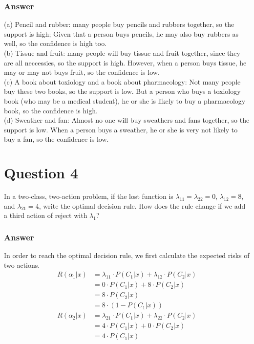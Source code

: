 \documentclass{article}
\begin{document}
\subsubsection*{Answer}
(a) Pencil and rubber: many people buy pencils and rubbers together, so the support is high; Given that a person buys pencils, he may also buy rubbers as well, so the confidence is high too.\\
(b) Tissue and fruit: many people will buy tissue and fruit together, since they are all neccessies, so the support is high. However, when a person buys tissue, he may or may not buys fruit, so the confidence is low.\\
(c) A book about toxiology and a book about pharmacology: Not many people buy these two books, so the support is low. But a person who buys a toxiology book (who may be a medical student), he or she is likely to buy a pharmacology book, so the confidence is high. \\
(d) Sweather and fan: Almost no one will buy sweathers and fans together, so the support is low. When a person buys a sweather, he or she is very not likely to buy a fan, so the confidence is low.


\section*{Question 4}
In a two-class, two-action problem, if the lost function is $\lambda_{11}=\lambda_{22}=0$, $\lambda_{12}=8$, and $\lambda_{21}=4$, write 
the optimal decision rule. How does the rule change if we add a third action of reject with $\lambda_1$?
\subsubsection*{Answer}
In order to reach the optimal decision rule, we first calculate the expected risks of two actions.
\begin{align*}
R(\alpha_1|x) &=\lambda_{11}\cdot P(C_1|x) +  \lambda_{12}\cdot P(C_2|x)\\
&=0\cdot P(C_1|x) + 8\cdot P(C_2|x)\\
&= 8\cdot P(C_2|x)\\
&= 8\cdot(1-P(C_1|x))
\end{align*}
\begin{align*}
    R(\alpha_2|x) &=\lambda_{21}\cdot P(C_1|x) +  \lambda_{22}\cdot P(C_2|x)\\
    &=4\cdot P(C_1|x) + 0\cdot P(C_2|x)\\
    &= 4\cdot P(C_1|x)
\end{align*}
\end{document}
